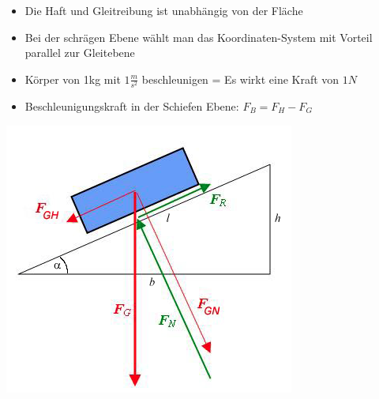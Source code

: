 \documentclass[
a4paper,
oneside,
landscape, 
8pt,
]{scrartcl}
\begin{document}
\begin{multicols*}{2}
\begin{itemize}
	\item Die Haft und Gleitreibung ist unabhängig von der Fläche
	\item Bei der schrägen Ebene wählt man das  Koordinaten-System mit Vorteil parallel zur Gleitebene
	\item Körper von 1kg mit $1\frac{m}{s^2}$ beschleunigen = Es wirkt eine Kraft von $1N$
	\item Beschleunigungskraft in der Schiefen Ebene: $F_B = F_H - F_G$
\end{itemize}

\begin{minipage}[h!]{0.3\linewidth}
\includegraphics[width=0.9\linewidth]{images/schiefe_ebene}
\end{minipage}
\hfill
\begin{minipage}[h!]{0.2\linewidth}

\end{minipage}
\end{multicols*}
\end{document}
